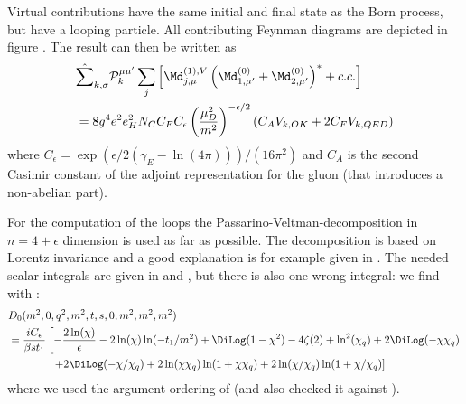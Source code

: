 Virtual contributions have the same initial and final state as the Born process, but have a looping particle. All contributing Feynman diagrams are depicted in figure .
The result can then be written as
\begin{align}
&\hat\sum_{k,\sigma}\mathcal P_{k}^{\mu\mu'}\sum_{j}\left[\Md^{(1),V}_{j,\mu}\left(\Md^{(0)}_{1,\mu'}+\Md^{(0)}_{2,\mu'}\right)^*+c.c.\right] \nonumber\\
 &= 8g^4e^2e_H^2 N_C C_FC_\epsilon\left(\frac{\mu_D^2}{m^2}\right)^{-\epsilon/2}\left( C_A V_{k,OK} + 2C_F V_{k,QED}\right)
\end{align}
where $C_\epsilon = \exp(\epsilon/2(\gamma_E-\ln(4\pi)))/(16\pi^2)$ and $C_A$ is the second Casimir constant of the adjoint representation for the gluon (that introduces a non-abelian part).

For the computation of the loops the Passarino-Veltman-decomposition\cite{Passarino:1978jh} in $n=4+\epsilon$ dimension is used as far as possible. The decomposition is based on Lorentz invariance and a good explanation is for example given in \cite{Bojak:2000eu}. The needed scalar integrals are given in \cite{PhysRevD4054} and \cite{Laenen1993162}, but there is also one wrong integral: we find with \cite[Box 16]{Ellis:2007qk}:
\begin{align}
&D_0(m^2,0,q^2,m^2,t,s,0,m^2,m^2,m^2)\nonumber\\
 &=\frac{i C_\epsilon}{\beta s t_1}\left[-\frac{2\ln(\chi)}{\epsilon} -2\ln(\chi)\ln(-t_1/m^2)+\DiLog(1-\chi^2)-4\zeta(2)+\ln^2(\chi_q) + 2\DiLog(-\chi\chi_q)\right.\nonumber\\
 &\hspace{40pt}\left. +2\DiLog(-\chi/\chi_q)+2\ln(\chi\chi_q)\ln(1+\chi\chi_q)+2\ln(\chi/\chi_q)\ln(1+\chi/\chi_q)\right]
\end{align}
where we used the argument ordering of \LoopTools\cite{Hahn:1998yk,LoopTools212Guide} (and also checked it against \LoopTools).

